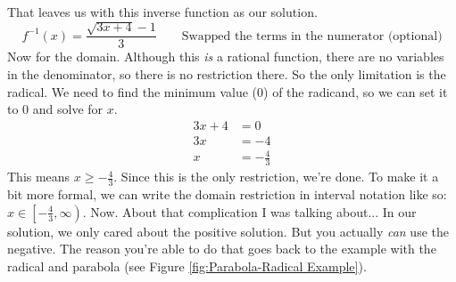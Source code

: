 That leaves us with this inverse function as our solution.
\[
\boxed{f^{-1}(x) = \frac{\sqrt{3x + 4} - 1}{3}} \qquad \text{Swapped the terms in the numerator (optional)}
\]
Now for the domain. Although this \textit{is} a rational function, there are no variables in the denominator, so there is no restriction there. So the only limitation is the radical. We need to find the minimum value ($0$) of the radicand, so we can set it to $0$ and solve for $x$.
\begin{align*}
    3x + 4 &= 0 \\
    3x &= -4 \\
    x &= -\frac{4}{3}
\end{align*}
This means $x \ge -\frac{4}{3}$. Since this is the only restriction, we're done. To make it a bit more formal, we can write the domain restriction in interval notation like so: $x \in \left[-\frac{4}{3}, \infty \right)$.
\clearpage
Now. About that complication I was talking about... In our solution, we only cared about the positive solution. But you actually \textit{can} use the negative. The reason you're able to do that goes back to the example with the radical and parabola (see Figure \ref{fig:Parabola-Radical Example}).

